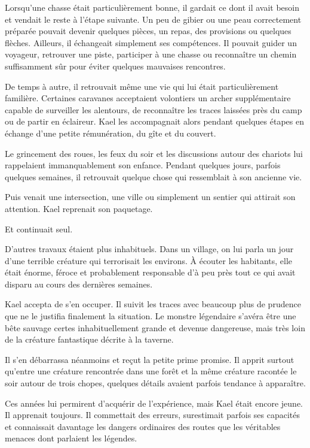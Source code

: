 Lorsqu'une chasse était particulièrement bonne, il gardait ce dont il avait
besoin et vendait le reste à l'étape suivante. Un peu de gibier ou une peau
correctement préparée pouvait devenir quelques pièces, un repas, des
provisions ou quelques flèches. Ailleurs, il échangeait simplement ses
compétences. Il pouvait guider un voyageur, retrouver une piste, participer à
une chasse ou reconnaître un chemin suffisamment sûr pour éviter quelques
mauvaises rencontres.

De temps à autre, il retrouvait même une vie qui lui était particulièrement
familière. Certaines caravanes acceptaient volontiers un archer supplémentaire
capable de surveiller les alentours, de reconnaître les traces laissées près
du camp ou de partir en éclaireur. Kael les accompagnait alors pendant
quelques étapes en échange d'une petite rémunération, du gîte et du couvert.

Le grincement des roues, les feux du soir et les discussions autour des
chariots lui rappelaient immanquablement son enfance. Pendant quelques jours,
parfois quelques semaines, il retrouvait quelque chose qui ressemblait à son
ancienne vie.

Puis venait une intersection, une ville ou simplement un sentier qui attirait
son attention. Kael reprenait son paquetage.

Et continuait seul.

\scenebreak

D'autres travaux étaient plus inhabituels. Dans un village, on lui parla un
jour d'une terrible créature qui terrorisait les environs. À écouter les
habitants, elle était énorme, féroce et probablement responsable d'à peu près
tout ce qui avait disparu au cours des dernières semaines.

Kael accepta de s'en occuper. Il suivit les traces avec beaucoup plus de
prudence que ne le justifia finalement la situation. Le monstre légendaire
s'avéra être une bête sauvage certes inhabituellement grande et devenue
dangereuse, mais très loin de la créature fantastique décrite à la taverne.

Il s'en débarrassa néanmoins et reçut la petite prime promise. Il apprit
surtout qu'entre une créature rencontrée dans une forêt et la même créature
racontée le soir autour de trois chopes, quelques détails avaient parfois
tendance à apparaître.

Ces années lui permirent d'acquérir de l'expérience, mais Kael était encore
jeune. Il apprenait toujours. Il commettait des erreurs, surestimait parfois
ses capacités et connaissait davantage les dangers ordinaires des routes que
les véritables menaces dont parlaient les légendes.

